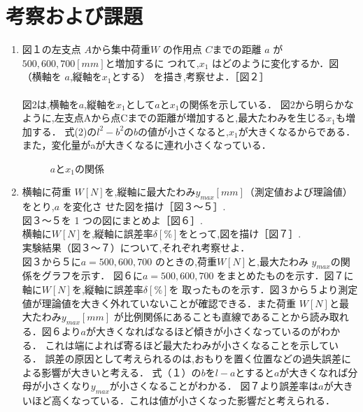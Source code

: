 \documentclass[a4paper,12pt]{jsarticle}
\begin{document}
\section{考察および課題}
\begin{enumerate}
  \item 図１の左支点 $A$から集中荷重$ W$ の作用点 $C $までの距離 $a$ が $500,600,700 [mm]$と増加するに
  つれて,$x_1$ はどのように変化するか．図（横軸を $a $,縦軸を$x_1$とする） を描き,考察せよ．［図２］\\
  \\
  \quad 図2は,横軸を$a$,縦軸を$x_1$として$a$と$x_1$の関係を示している．
  図2から明らかなように,左支点Aから点Cまでの距離が増加すると,最大たわみを生じる$x_1$も増加する．
  式(2)の$l^2-b^2$の$b$の値が小さくなると,$x_1$が大きくなるからである．
  また，変化量がaが大きくなるに連れ小さくなっている．

\clearpage
\begin{figure}[h]
  \centering
  \caption{$a$と$x_1$の関係}
\end{figure}
\clearpage

\item 横軸に荷重 $W [N] $を,縦軸に最大たわみ$ y_{max}[mm]$（測定値および理論値）をとり,$a$ を変化さ
せた図を描け［図３～５］.\\
図３～５を 1 つの図にまとめよ［図６］.\\
横軸に$ W [N]$を,縦軸に誤差率$ \delta [\%]$をとって,図を描け［図７］.\\
実験結果（図３～７）について,それぞれ考察せよ．\\
  
\quad 図３から５に$a = 500,600,700$ のときの,荷重$ W [N] $と,最大たわみ $y_{max}$の関係をグラフを示す．
図６に$a = 500,600,700$ をまとめたものを示す．図７に軸に$ W [N]$を,縦軸に誤差率$ \delta [\%]$を
取ったものを示す．図３から５より測定値が理論値を大きく外れていないことが確認できる．また荷重 $W [N] $と最大たわみ$ y_{max}[mm]$
が比例関係にあることも直線であることから読み取れる．図６より$a$が大きくなればなるほど傾きが小さくなっているのがわかる．
これは端によれば寄るほど最大たわみが小さくなることを示している．
誤差の原因として考えられるのは,おもりを置く位置などの過失誤差による影響が大きいと考える．
式（１）の$b$を$l-a$とすると$a$が大きくなれば分母が小さくなり$y_{max}$が小さくなることがわかる．
図７より誤差率は$a$が大きいほど高くなっている．これは値が小さくなった影響だと考えられる．


\end{enumerate}
\end{document}
